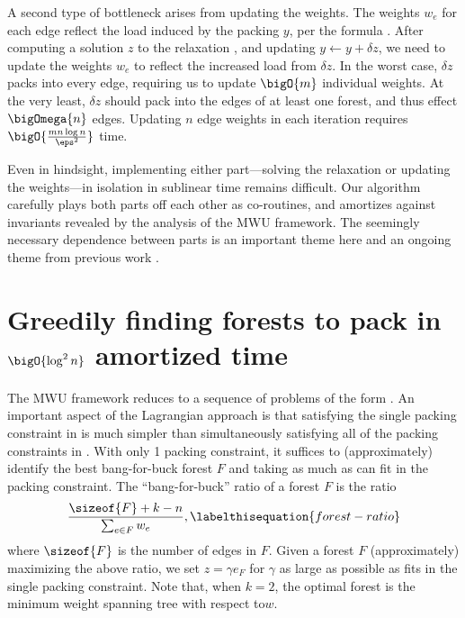 \documentclass[11pt]{article}
\numberwithin{equation}{section}
\theoremstyle{definition}
\theoremstyle{plain}
\newcommand{\weight}[1]{w_{#1}}
\newcommand{\weightv}{w}%
\newcommand{\wrt}{with respect to\xspace} %
\begin{document}
A second type of bottleneck arises from updating the weights. The
weights $\weight{e}$ for each edge reflect the load induced by the
packing $y$, per the formula . After
computing a solution $z$ to the relaxation ,
and updating $y \gets y + \delta z$, we need to update the weights
$\weight{e}$ to reflect the increased load from $\delta z$. In the
worst case, $\delta z$ packs into every edge, requiring us to update
$\bigO{m}$ individual weights. At the very least, $\delta z$ should
pack into the edges of at least one forest, and thus effect
$\bigOmega{n}$ edges. Updating $n$ edge weights in each iteration
requires $\bigO{\frac{m n \log n}{\eps^2}}$ time.

Even in hindsight, implementing either part---solving the relaxation
or updating the weights---in %
isolation in sublinear time
%
%
remains difficult. Our algorithm carefully plays both parts off each other
as co-routines, and amortizes against invariants revealed by the analysis
of the MWU framework. The seemingly necessary dependence between parts
is an important theme
%
here %
and an ongoing theme from previous
work \cite{cq-17-focs,cq-17-soda,cq-19}.

\section{Greedily finding forests to pack in $\bigO{\log^2 n}$
  amortized time}


The MWU framework reduces  to a sequence
of problems of the form .  An important aspect
of the Lagrangian approach is that satisfying the single packing
constraint in  is much simpler than
simultaneously satisfying all of the packing constraints in
. With only 1 packing constraint, it
suffices to (approximately) identify the best bang-for-buck forest $F$
and taking as much as can fit in the packing constraint. The
``bang-for-buck'' ratio of a forest $F$ is the ratio
\begin{align*}
  \frac{\sizeof{F} + k - n}{\sum_{e \in F} \weight{e}},
  \labelthisequation{forest-ratio}
\end{align*}
where $\sizeof{F}$ is the number of edges in $F$. Given a forest $F$
(approximately) maximizing the above ratio, we set $z = \gamma e_F$
for $\gamma$ as large as possible as fits in the single packing
constraint. Note that, when $k = 2$, the optimal forest is the minimum
weight spanning tree \wrt $\weightv$.
\end{document}
